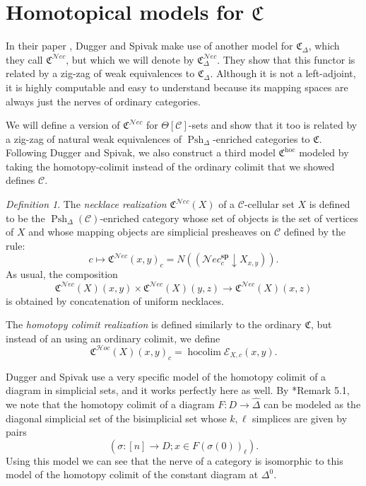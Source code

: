 \documentclass{amsart}
\numberwithin{equation}{section}
\theoremstyle{plain}   %
\theoremstyle{remark}
\newtheorem{defn}[subsection]{Definition}
\theoremstyle{plain}
\DeclareMathOperator{\Psh}{Psh}
\newcommand{\Nec}{\ensuremath{{\mathcal{N}ec}}}
\newcommand{\Hoc}{\ensuremath{{\mathcal{H}oc}}}
\newcommand{\overcat}[2]{{\left(#1\downarrow #2\right)}}
\DeclareMathOperator{\hocolim}{hocolim}
\newcommand{\psh}[1]{\ensuremath{\widehat{#1}}}
\newcommand{\C}{\ensuremath{\mathcal{C}}}
\newcommand{\spsh}{\ensuremath{\operatorname{Psh}_\Delta(\mathcal{C})}}
\begin{document}
\section{Homotopical models for \(\mathfrak{C}\)}
In their paper \cite{ds1}, Dugger and Spivak make use of another model for \(\mathfrak{C}_\Delta\), which they call \(\mathfrak{C}^\Nec\), but which we will denote by \(\mathfrak{C}_\Delta^\Nec\).  They show that this functor is related by a zig-zag of weak equivalences to \(\mathfrak{C}_\Delta\).  Although it is not a left-adjoint, it is highly computable and easy to understand because its mapping spaces are always just the nerves of ordinary categories.

We will define a version of \(\mathfrak{C}^\Nec\) for \(\Theta[\C]\)-sets and show that it too is related by a zig-zag of natural weak equivalences of \(\Psh_\Delta\)-enriched categories to \(\mathfrak{C}\). Following Dugger and Spivak, we also construct a third model \(\mathfrak{C}^{\operatorname{hoc}}\) modeled by taking the homotopy-colimit instead of the ordinary colimit that we showed defines \(\mathcal{C}\).

\begin{defn}
	The \emph{necklace realization} \(\mathfrak{C}^\Nec(X)\) of a \(\C\)-cellular set \(X\) is defined to be the \(\spsh\)-enriched category whose set of objects is the set of vertices of \(X\) and whose mapping objects are simplicial presheaves on \(\C\) defined by the rule:
	\[c\mapsto \mathfrak{C}^\Nec(x,y)_c=N(\overcat{\Nec^\mathbf{sp}_c}{X_{x,y}}).\]
	As usual, the composition \[\mathfrak{C}^\Nec(X)(x,y)\times \mathfrak{C}^\Nec(X)(y,z)\to \mathfrak{C}^\Nec(X)(x,z)\] is obtained by concatenation of uniform necklaces.

	The \emph{homotopy colimit realization} is defined similarly to the ordinary \(\mathfrak{C}\), but instead of an using an ordinary colimit, we define \[\mathfrak{C}^\Hoc(X)(x,y)_c=\hocolim\mathcal{E}_{X,c}(x,y).\]
\end{defn}

Dugger and Spivak use a very specific model of the homotopy colimit of a diagram in simplicial sets, and it works perfectly here as well.  By \cite{ds1}*{Remark 5.1}, we note that the homotopy colimit of a diagram \(F:D\to \psh{\Delta}\) can be modeled as the diagonal simplicial set of the bisimplicial set whose \(k,\ell\) simplices are given by pairs \[(\sigma:[n]\to D; x \in F(\sigma(0))_\ell).\]  Using this model we can see that the nerve of a category is isomorphic to this model of the homotopy colimit of the constant diagram at \(\Delta^0\).
\end{document}
